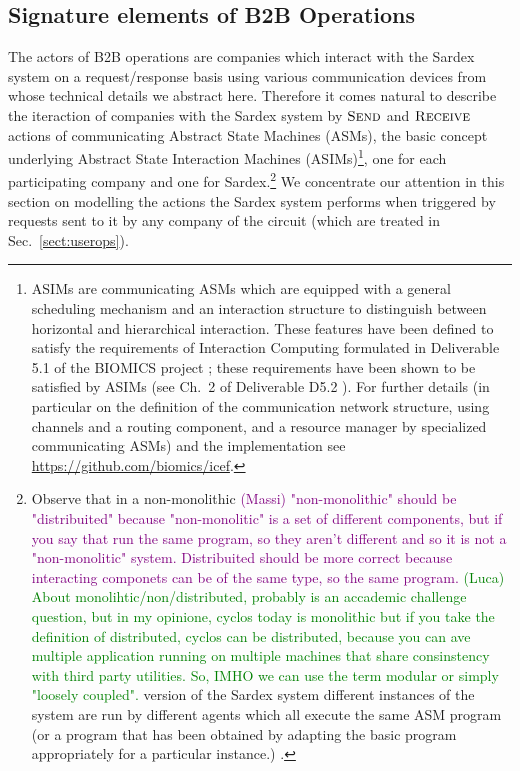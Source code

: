 \subsection{Signature elements of B2B Operations}
\label{signaturepaymtop}
The actors of B2B operations are companies which interact with the Sardex system on a request/response basis using various 
communication devices from whose technical details we abstract here. Therefore it comes natural to describe the iteraction of companies with the Sardex system by $\hbox{\sc Send}$ and $\hbox{\sc Receive}$ actions of communicating Abstract State Machines (ASMs), the basic concept underlying Abstract State Interaction Machines (ASIMs)\footnote{ASIMs are communicating ASMs which are equipped with a general scheduling mechanism and an interaction structure to distinguish
between horizontal and hierarchical interaction. These features have
been defined to satisfy the requirements of Interaction Computing
formulated in Deliverable 5.1 of the BIOMICS project  \cite{BIOMICSD51}; these requirements have been shown to be satisfied by ASIMs (see Ch.\ 2 of
Deliverable D5.2 \cite{BIOMICSD52}). For further details (in particular on the
definition of the communication network structure, using channels and
a routing component, and a resource manager by specialized
communicating ASMs) and the implementation see
\url{https://github.com/biomics/icef}.}, one for each participating company and one for Sardex.\footnote{Observe that in a non-monolithic \textcolor{purple}{(Massi) "non-monolithic" should be "distribuited" because "non-monolitic" is a set of different components, but if you say that run the same program, so they aren't different and so it is not a "non-monolitic" system. Distribuited should be more correct because interacting componets can be of the same type, so the same program.} \textcolor{green}{(Luca) About monolihtic/non/distributed, probably is an accademic challenge question, but in my opinione, cyclos today is monolithic but if you take the definition of distributed, cyclos can be distributed, because you can ave multiple application running on multiple machines that share consinstency with third party utilities. So, IMHO we can use the term modular  or simply  "loosely coupled".} version of the Sardex system different instances of the system are run by different agents which all execute the same ASM program (or a program that has been obtained by adapting the basic program appropriately for a particular instance.) .} We concentrate our attention in this section on modelling the actions the Sardex system performs when triggered by requests sent to it by any company of the circuit (which are treated in Sec.~\ref{sect:userops}).

